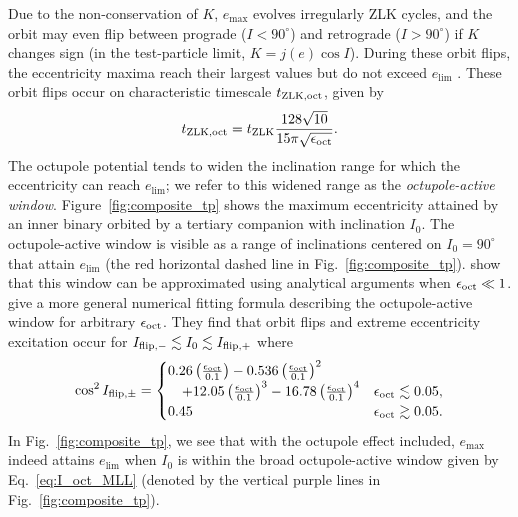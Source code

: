\documentclass[
        fleqn,
        usenatbib,
    ]{mnras}
\newcommand*{\p}[1]{\left(#1\right)}
\begin{document}
Due to the non-conservation of $K$, $e_{\max}$ evolves irregularly ZLK cycles,
and the orbit may even flip between prograde ($I < 90^\circ$) and retrograde ($I
> 90^\circ$) if $K$ changes sign (in the test-particle limit, $K = j(e) \cos
I$). During these orbit flips, the eccentricity maxima reach their largest
values but do not exceed $e_{\lim}$ \citep{lithwick2011eccentric, LML15,
anderson2016formation}. These orbit flips occur on characteristic timescale
$t_{\rm ZLK, oct}$, given by \citep{antognini2015timescales}
\begin{align}
    t_{\rm ZLK, oct} = t_{\rm ZLK}\frac{128\sqrt{10}}{
        15\pi\sqrt{\epsilon_{\rm oct}}}.\label{eq:def_tzlkoct}
\end{align}
The octupole potential tends to widen the inclination range for which the
eccentricity can reach $e_{\lim}$; we refer to this widened range as the
\emph{octupole-active window}. Figure~\ref{fig:composite_tp} shows the maximum
eccentricity attained by an inner binary orbited by a tertiary companion with
inclination $I_0$. The octupole-active window is visible as a range of
inclinations centered on $I_0 = 90^\circ$ that attain $e_{\lim}$ (the red
horizontal dashed line in Fig.~\ref{fig:composite_tp}). \citet{katz2011long}
show that this window can be approximated using analytical arguments when
$\epsilon_{\rm oct} \ll 1$. \citet{MLL16} give a more general numerical fitting
formula describing the octupole-active window for arbitrary $\epsilon_{\rm
oct}$. They find that orbit flips and extreme eccentricity excitation occur for
$I_{\rm flip, -} \lesssim I_0 \lesssim I_{\rm flip, +}$ where
\begin{align}
    \cos^2 I_{\rm flip, \pm} = \begin{cases}
        0.26\p{\frac{\epsilon_{\rm oct}}{0.1}}
            - 0.536\p{\frac{\epsilon_{\rm oct}}{0.1}}^2\\
            \quad + 12.05\p{\frac{\epsilon_{\rm oct}}{0.1}}^3
            - 16.78\p{\frac{\epsilon_{\rm oct}}{0.1}}^4
            & \epsilon_{\rm oct} \lesssim 0.05,\\
        0.45 & \epsilon_{\rm oct} \gtrsim 0.05.
    \end{cases} \label{eq:I_oct_MLL}
\end{align}
In Fig.~\ref{fig:composite_tp}, we see that with the octupole effect included,
$e_{\max}$ indeed attains $e_{\lim}$ when $I_0$ is within the broad
octupole-active window given by Eq.~\eqref{eq:I_oct_MLL} (denoted by the
vertical purple lines in Fig.~\ref{fig:composite_tp}).
\end{document}
